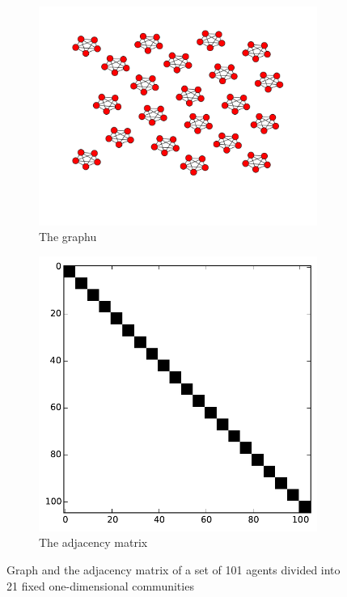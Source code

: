 \begin{figure}[h]
        \centering
        \begin{subfigure}[b]{0.5\textwidth}
        	\centering
                \includegraphics[width=\textwidth]{images/topology/fixed_patch_graph.pdf}
                \caption{The graphu}
        \end{subfigure}
        \begin{subfigure}[b]{0.4\textwidth}
        	\centering
                \includegraphics[width=\textwidth]{images/topology/fixed_patch_adjacency.pdf}
                \caption{The adjacency matrix}
                \label{subfig:fixed adjacency}
        \end{subfigure}
        \caption{Graph and the adjacency matrix of a set of 101 agents divided into 21 fixed one-dimensional communities}
        \label{fig:fixed adjacency graph}
\end{figure}

